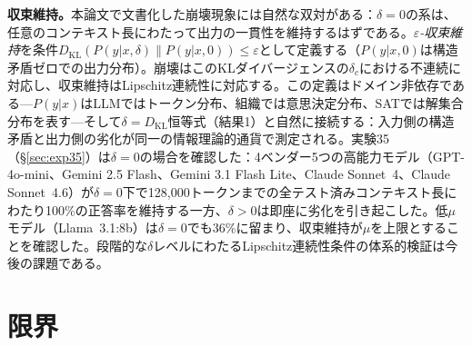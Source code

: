\documentclass[11pt,a4paper]{article}
\begin{document}
\textbf{収束維持。}本論文で文書化した崩壊現象には自然な双対がある：$\delta = 0$の系は、任意のコンテキスト長にわたって出力の一貫性を維持するはずである。\emph{$\varepsilon$-収束維持}を条件$D_{\text{KL}}(P(y|x, \delta) \| P(y|x, 0)) \leq \varepsilon$として定義する（$P(y|x, 0)$は構造矛盾ゼロでの出力分布）。崩壊はこのKLダイバージェンスの$\delta_c$における不連続に対応し、収束維持はLipschitz連続性に対応する。この定義はドメイン非依存である---$P(y|x)$はLLMではトークン分布、組織では意思決定分布、SATでは解集合分布を表す---そして$\delta = D_{\text{KL}}$恒等式（結果1）と自然に接続する：入力側の構造矛盾と出力側の劣化が同一の情報理論的通貨で測定される。実験35（\S\ref{sec:exp35}）は$\delta = 0$の場合を確認した：4ベンダー5つの高能力モデル（GPT-4o-mini、Gemini 2.5 Flash、Gemini 3.1 Flash Lite、Claude Sonnet~4、Claude Sonnet~4.6）が$\delta = 0$下で128{,}000トークンまでの全テスト済みコンテキスト長にわたり100\%の正答率を維持する一方、$\delta > 0$は即座に劣化を引き起こした。低$\mu$モデル（Llama~3.1:8b）は$\delta = 0$でも36\%に留まり、収束維持が$\mu$を上限とすることを確認した。段階的な$\delta$レベルにわたるLipschitz連続性条件の体系的検証は今後の課題である。

\section{限界}
\label{sec:limitations}
\end{document}
